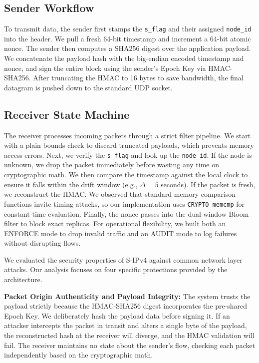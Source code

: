 \documentclass[journal]{IEEEtran}
\begin{document}
\subsection{Sender Workflow}
To transmit data, the sender first stamps the \texttt{s\_flag} and their assigned \texttt{node\_id} into the header. We pull a fresh 64-bit timestamp and increment a 64-bit atomic nonce. The sender then computes a SHA256 digest over the application payload. We concatenate the payload hash with the big-endian encoded timestamp and nonce, and sign the entire block using the sender's Epoch Key via HMAC-SHA256. After truncating the HMAC to 16 bytes to save bandwidth, the final datagram is pushed down to the standard UDP socket.

\subsection{Receiver State Machine}
The receiver processes incoming packets through a strict filter pipeline. We start with a plain bounds check to discard truncated payloads, which prevents memory access errors. Next, we verify the \texttt{s\_flag} and look up the \texttt{node\_id}. If the node is unknown, we drop the packet immediately before wasting any time on cryptographic math. We then compare the timestamp against the local clock to ensure it falls within the drift window (e.g., $\Delta = 5$ seconds). If the packet is fresh, we reconstruct the HMAC. We observed that standard memory comparison functions invite timing attacks, so our implementation uses \texttt{CRYPTO\_memcmp} for constant-time evaluation. Finally, the nonce passes into the dual-window Bloom filter to block exact replicas. For operational flexibility, we built both an ENFORCE mode to drop invalid traffic and an AUDIT mode to log failures without disrupting flows.

\label{sec:security}
We evaluated the security properties of S-IPv4 against common network layer attacks. Our analysis focuses on four specific protections provided by the architecture.

\textbf{Packet Origin Authenticity and Payload Integrity:} The system trusts the payload strictly because the HMAC-SHA256 digest incorporates the pre-shared Epoch Key. We deliberately hash the payload data before signing it. If an attacker intercepts the packet in transit and alters a single byte of the payload, the reconstructed hash at the receiver will diverge, and the HMAC validation will fail. The receiver maintains no state about the sender's flow, checking each packet independently based on the cryptographic math.
\end{document}
